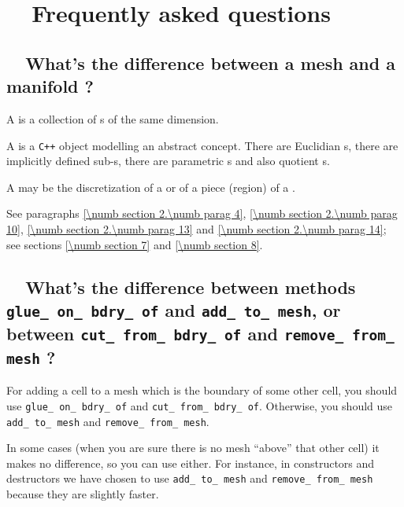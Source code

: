 
\chapter {~~{Frequently asked questions}}\label{\numb section 13}

\section{~~What's the difference between a mesh and a manifold ?}
\label{\numb section 13.\numb parag 1}

A {\small\tt{}} is a collection of {\small\tt{}}s of the
same dimension.

A {\small\tt{}} is a {\tt C++} object modelling an abstract concept.
There are Euclidian {\small\tt{}}s, there are implicitly defined
sub-{\small\tt{}}s, there are parametric {\small\tt{}}s
and also quotient {\small\tt{}}s.

A {\small\tt{}} may be the discretization of a {\small\tt{}}
or of a piece (region) of a {\small\tt{}}.

See paragraphs \ref{\numb section 2.\numb parag 4}, \ref{\numb section 2.\numb parag 10},
\ref{\numb section 2.\numb parag 13} and \ref{\numb section 2.\numb parag 14};
see sections \ref{\numb section 7} and \ref{\numb section 8}.


\section{~~What's the difference between methods {\tt glue\_\,on\_\,bdry\_\,of} and
  {\tt add\_\,to\_\,mesh}, or between {\tt cut\_\,from\_\,bdry\_\,of} and
  {\tt remove\_\,from\_\,mesh} ?}
\label{\numb section 13.\numb parag 2}

For adding a cell to a mesh which is the boundary of some other cell,
you should use {\small\tt glue\_\,on\_\,bdry\_\,of} and {\small\tt cut\_\,from\_\,bdry\_\,of}.
Otherwise, you should use {\small\tt add\_\,to\_\,mesh} and {\small\tt remove\_\,from\_\,mesh}.

In some cases (when you are sure there is no mesh ``above'' that other cell)
it makes no difference, so you can use either.
For instance, in {\small\tt{}} constructors and destructors
we have chosen to use {\small\tt add\_\,to\_\,mesh} and {\small\tt remove\_\,from\_\,mesh}
because they are slightly faster.



